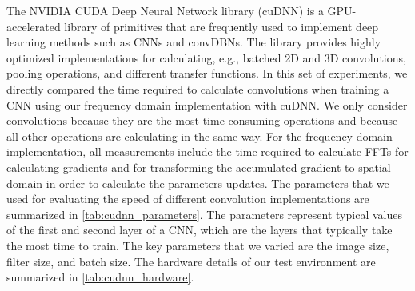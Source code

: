 The NVIDIA CUDA Deep Neural Network library (cuDNN) \citep{chetlur2014} is a
GPU-accelerated library of primitives that are frequently used to implement deep
learning methods such as CNNs and convDBNs. The library provides highly
optimized implementations for calculating, e.g., batched 2D and 3D convolutions,
pooling operations, and different transfer functions. In this set of
experiments, we directly compared the time required to calculate convolutions
when training a CNN using our frequency domain implementation with cuDNN. We
only consider convolutions because they are the most time-consuming operations
and because all other operations are calculating in the same way. For the
frequency domain implementation, all measurements include the time required to
calculate FFTs for calculating gradients and for transforming the accumulated
gradient to spatial domain in order to calculate the parameters updates. The
parameters that we used for evaluating the speed of different convolution
implementations are summarized in \ref{tab:cudnn_parameters}. The parameters
represent typical values of the first and second layer of a CNN, which are the
layers that typically take the most time to train. The key parameters that we
varied are the image size, filter size, and batch size. The hardware details of
our test environment are summarized in \ref{tab:cudnn_hardware}.



